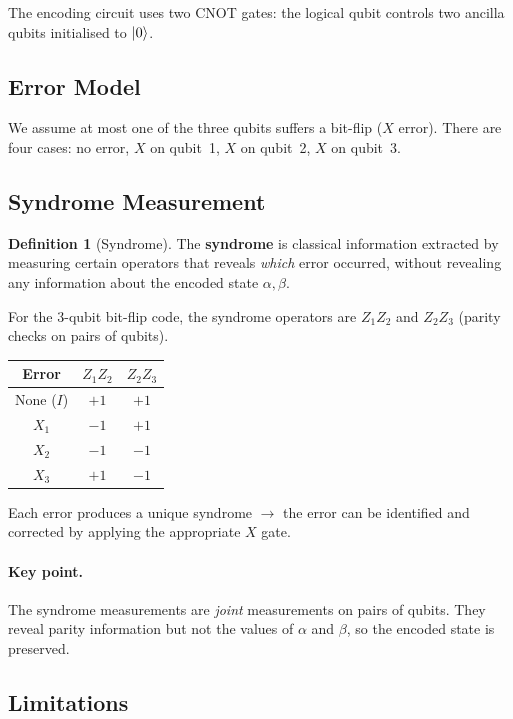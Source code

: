 \documentclass[11pt]{article}
\theoremstyle{definition}
\newtheorem{definition}{Definition}[section]
\begin{document}
The encoding circuit uses two CNOT gates: the logical qubit controls two ancilla qubits initialised to $\ket{0}$.

\subsection{Error Model}

We assume at most one of the three qubits suffers a bit-flip ($X$ error).  There are four cases: no error, $X$ on qubit~1, $X$ on qubit~2, $X$ on qubit~3.

\subsection{Syndrome Measurement}

\begin{definition}[Syndrome]
The \textbf{syndrome} is classical information extracted by measuring certain operators that reveals \emph{which} error occurred, without revealing any information about the encoded state $\alpha,\beta$.
\end{definition}

For the 3-qubit bit-flip code, the syndrome operators are $Z_1 Z_2$ and $Z_2 Z_3$ (parity checks on pairs of qubits).

\begin{center}
\begin{tabular}{ccc}
\hline
\textbf{Error} & $Z_1 Z_2$ & $Z_2 Z_3$ \\\hline
None ($I$) & $+1$ & $+1$ \\
$X_1$ & $-1$ & $+1$ \\
$X_2$ & $-1$ & $-1$ \\
$X_3$ & $+1$ & $-1$ \\
\hline
\end{tabular}
\end{center}

Each error produces a unique syndrome $\to$ the error can be identified and corrected by applying the appropriate $X$ gate.

\paragraph{Key point.}  The syndrome measurements are \emph{joint} measurements on pairs of qubits.  They reveal parity information but not the values of $\alpha$ and $\beta$, so the encoded state is preserved.

\subsection{Limitations}
\end{document}
